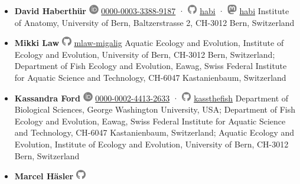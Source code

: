 \begin{itemize}
\item
  \textbf{David Haberthür}
  \includegraphics[width=0.16667in,height=0.16667in]{images/orcid.svg}
  \href{https://orcid.org/0000-0003-3388-9187}{0000-0003-3388-9187} ·
  \includegraphics[width=0.16667in,height=0.16667in]{images/github.svg}
  \href{https://github.com/habi}{habi}
  · \includegraphics[width=0.16667in,height=0.16667in]{images/mastodon.svg}
  \href{https://mastodon.social/@habi}{habi}
  Institute of Anatomy, University of Bern, Baltzerstrasse 2, CH-3012 Bern, Switzerland
\item
  \textbf{Mikki Law}
  \includegraphics[width=0.16667in,height=0.16667in]{images/github.svg}
  \href{https://github.com/mlaw-migalig}{mlaw-migalig}
  Aquatic Ecology and Evolution, Institute of Ecology and Evolution, University of Bern, CH-3012 Bern, Switzerland; Department of Fish Ecology and Evolution, Eawag, Swiss Federal Institute for Aquatic Science and Technology, CH-6047 Kastanienbaum, Switzerland
\item
  \textbf{Kassandra Ford}
  \includegraphics[width=0.16667in,height=0.16667in]{images/orcid.svg}
  \href{https://orcid.org/0000-0002-4413-2633}{0000-0002-4413-2633} ·
  \includegraphics[width=0.16667in,height=0.16667in]{images/github.svg}
  \href{https://github.com/kassthefish}{kassthefish}
  Department of Biological Sciences, George Washington University, USA; Department of Fish Ecology and Evolution, Eawag, Swiss Federal Institute for Aquatic Science and Technology, CH-6047 Kastanienbaum, Switzerland; Aquatic Ecology and Evolution, Institute of Ecology and Evolution, University of Bern, CH-3012 Bern, Switzerland
\item
  \textbf{Marcel Häsler}
  \includegraphics[width=0.16667in,height=0.16667in]{images/github.svg}

\end{itemize}
